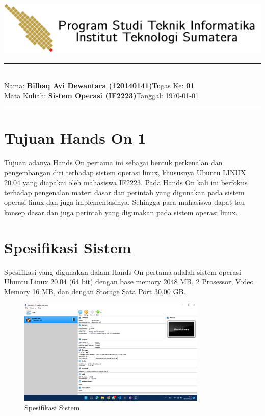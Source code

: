 \documentclass[11pt,a4paper]{article}
\newcommand{\stuid}{120140141}
\newcommand{\student}{\textbf{Bilhaq Avi Dewantara (\stuid{})}}
\newcommand{\course}{\textbf{Sistem Operasi (IF2223)}}
\newcommand{\assignment}{\textbf{01}} %
\begin{document}
\thispagestyle{empty}
\begin{center}
	\includegraphics[scale = 0.15]{Figure/ifitera-header.png}
	\vspace{0.1cm}
\end{center}
\noindent
{\large
\rule{17cm}{0.2cm}\\[0.3cm]
Nama: \student \hfill Tugas Ke: \assignment\\[0.1cm]
Mata Kuliah: \course \hfill Tanggal: \today\\
\rule{17cm}{0.05cm}
\vspace{0.1cm}
}


\section{Tujuan Hands On 1}
    Tujuan adanya Hands On pertama ini sebagai bentuk perkenalan dan pengembangan diri terhadap sistem operasi linux, 
	khususnya Ubuntu LINUX 20.04 yang diapakai oleh mahasiswa IF2223. Pada Hands On kali ini berfokus terhadap pengenalan 
	materi dasar dan perintah yang digunakan pada sistem operasi linux dan juga implementasinya. Sehingga para mahasiswa 
	dapat tau konsep dasar dan juga perintah yang digunakan pada sistem operasi linux.

\section{Spesifikasi Sistem}
    Spesifikasi yang digunakan dalam Hands On pertama adalah sistem operasi Ubuntu Linux 20.04 (64 bit) dengan base memory 2048 MB, 
	2 Prosessor, Video Memory 16 MB, dan dengan Storage Sata Port 30,00 GB.
	\begin{figure}[h]
		\centering
		\includegraphics[width=0.8\textwidth]{Figure/Spek Sistem.png}
		\caption{Spesifikasi Sistem}
	\end{figure}
\end{document}
